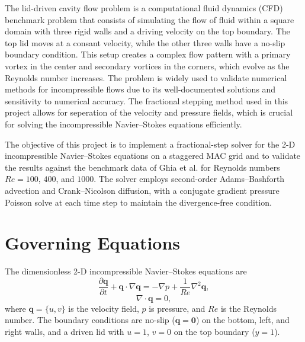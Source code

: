 \documentclass[
  aapm,
  amsmath,amssymb,
  reprint,          %
  floatfix
]{revtex4-2}
\begin{document}
The lid-driven cavity flow problem is a computational fluid dynamics (CFD) benchmark
problem that consists of simulating the flow of fluid within a square domain with 
three rigid walls and a driving velocity on the top boundary. The top lid moves at 
a consant velocity, while the other three walls have a no-slip boundary condition. 
This setup creates a complex flow pattern with a primary vortex in the center and 
secondary vortices in the corners, which evolve as the Reynolds number increases. 
The problem is widely used to validate numerical methods for incompressible flows 
due to its well-documented solutions and sensitivity to numerical accuracy. The fractional
stepping method used in this project allows for seperation of the velocity and 
pressure fields, which is crucial for solving the incompressible Navier--Stokes equations 
efficiently.

The objective of this project is to implement a fractional-step solver for the 2-D
incompressible Navier--Stokes equations on a staggered MAC grid and to validate the
results against the benchmark data of Ghia et al. for Reynolds numbers
$Re=100$, $400$, and $1000$. The solver employs second-order Adams--Bashforth advection
and Crank--Nicolson diffusion, with a conjugate gradient pressure Poisson solve at each
time step to maintain the divergence-free condition.

\section{Governing Equations}
%
%
The dimensionless 2-D incompressible Navier--Stokes equations are
\begin{equation}
  \frac{\partial \bm{q}}{\partial t} + \bm{q}\cdot\nabla\bm{q}
  = -\nabla p + \frac{1}{Re}\nabla^2\bm{q},
  \label{eq:momentum}
\end{equation}
\begin{equation}
  \nabla\cdot\bm{q} = 0,
  \label{eq:continuity}
\end{equation}
where $\bm{q}=\{u,v\}$ is the velocity field, $p$ is pressure, and $Re$ is the
Reynolds number. The boundary conditions are no-slip ($\bm{q}=\bm{0}$) on the bottom,
left, and right walls, and a driven lid with $u=1$, $v=0$ on the top boundary ($y=1$).
\end{document}
